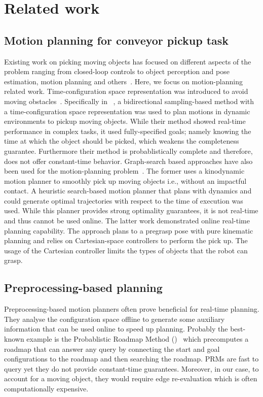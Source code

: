 \documentclass[conference]{IEEEtran}
\begin{document}
\section{Related work}
\subsection{Motion planning for conveyor pickup task}
Existing work on picking moving objects has focused on different aspects of the problem ranging from closed-loop controls to object perception and pose estimation, motion planning and others~\cite{allen1993automated, han2019toward, stogl2017tracking, zhang2018gilbreth}. 
%
Here, we focus on motion-planning related work. Time-configuration space representation was introduced to avoid moving obstacles~\cite{fraichard1993dynamic,cefalo2013task,yang2018planning}. Specifically in ~\cite{yang2018planning}, a bidirectional sampling-based method with a time-configuration space representation was used to plan motions in dynamic environments to pickup moving objects. While their method showed real-time performance in complex tasks, it used fully-specified goals; namely knowing the time at which the object should be picked, which weakens the completeness guarantee. Furthermore their method is probablistically complete and therefore, does not offer constant-time behavior.
Graph-search based approaches have also been used for the motion-planning problem~\cite{menon2014motion, cowley2013perception}. The former uses a kinodynamic motion planner to smoothly pick up moving objects i.e., without an impactful contact. A heuristic search-based motion planner that plans with dynamics and could generate optimal trajectories with respect to the time of execution was used. While this planner provides strong optimality guarantees, it is not real-time and thus cannot be used online.
%
The latter work demonstrated online real-time planning capability. The approach plans to a pregrasp pose with pure kinematic planning and relies on Cartesian-space controllers to perform the pick up. The usage of the Cartesian controller limits the types of objects that the robot can grasp.


\subsection{Preprocessing-based planning}
Preprocessing-based motion planners often prove beneficial for real-time planning. They analyse the configuration space offline to generate some auxiliary information that can be used online to speed up planning. 
Probably the best-known example is the Probablistic Roadmap Method ()~\cite{kavraki1996probabilistic} which precomputes a roadmap that can answer any query by connecting the start and goal configurations to the roadmap and then searching the roadmap. \textsf{PRM}s are fast to query yet they do not provide constant-time guarantees.
Moreover, in our case, to account for a moving object, they would require edge re-evaluation which is often computationally expensive.
%
\end{document}
